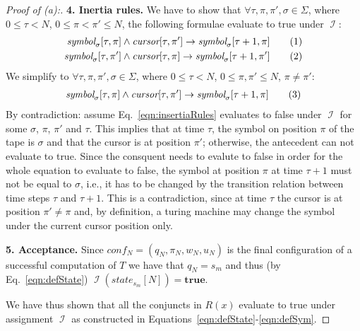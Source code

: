 \documentclass [11pt]{article}
\newcommand{\ra}{\rightarrow}
\newcommand{\sym}[3]{\textit{symbol}_{#1}[#2,#3]}
\newcommand{\cursor}[2]{\textit{cursor}[#1,#2]}
\newcommand{\state}[2]{\textit{state}_{#1}[#2]}
\DeclareMathOperator{\II}{\mathcal{I}}
\newcommand{\True}{\mathbf{true}}
\newcommand\numberthis{\addtocounter{equation}{1}\tag{\theequation}}
\newcommand\neqn[1]{\numberthis\label{eqn:#1}}
\begin{document}
\begin{proof}[Proof of (a):]
\smallskip 
\noindent
{\bf 4. Inertia rules.} 
We have to show that $\forall \tau, \pi, \pi', \sigma \in \Sigma$,
where $0 \leq \tau < N$, $0 \leq \pi < \pi' \leq N$, the following formulae evaluate to true under $\II$:
\begin{align*}
\sym{\sigma}{\tau}{\pi} \land \cursor{\tau}{\pi'} \ra \sym{\sigma}{\tau+1}{\pi}
\neqn{insertiaRules1} \\
\sym{\sigma}{\tau}{\pi'} \land \cursor{\tau}{\pi} \ra  \sym{\sigma}{\tau+1}{\pi'}
\neqn{insertiaRules2}
\end{align*}
We simplify to $\forall \tau, \pi, \pi', \sigma \in \Sigma$,
where $0 \leq \tau < N$, $0 \leq \pi, \pi' \leq N$, $\pi\neq \pi'$:
\begin{align*}
\sym{\sigma}{\tau}{\pi} \land \cursor{\tau}{\pi'} \ra \sym{\sigma}{\tau+1}{\pi}
\neqn{insertiaRules} 
\end{align*}
By contradiction: assume Eq.~\ref{eqn:insertiaRules} evaluates to false under $\II$ for some $\sigma$, $\pi$, $\pi'$ and $\tau$.
This implies that at time $\tau$, the symbol on position $\pi$ of the tape is $\sigma$ and that the cursor is at position $\pi'$; otherwise, the antecedent can not evaluate to true. 
Since the consquent needs to evalute to false in order for the whole equation to evaluate to false, the symbol at position $\pi$ at time $\tau+1$ must not be equal to $\sigma$, i.e., it has to be changed by the transition relation between time steps $\tau$ and $\tau+1$. 
This is a contradiction, since at time $\tau$ the cursor is at position $\pi' \neq \pi$ and, by definition, a turing machine may change the symbol under the current cursor position only.

\smallskip 
\noindent
{\bf 5. Acceptance.} 
Since $conf_N = (q_N, \pi_N, w_N, u_N)$ is the final configuration of a successful computation of $T$ we have that $q_N = s_m$ and thus (by Eq.~\ref{eqn:defState}) $\II(\state{s_m}{N}) = \True$.

\bigskip
\noindent
We have thus shown that all the conjuncts in $R(x)$ evaluate to true under assignment $\II$ as constructed in Equations~\ref{eqn:defState}-\ref{eqn:defSym}.
\end{proof}
\end{document}
